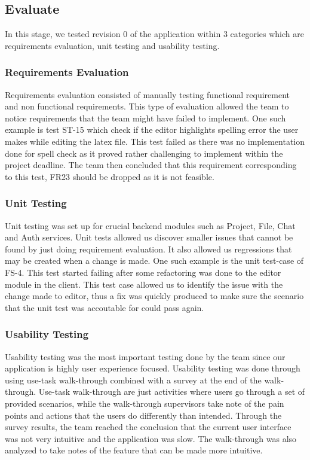 \documentclass{article}
\begin{document}
	\subsection{Evaluate}
	In this stage, we tested revision 0 of the application within 3 categories which are requirements evaluation, unit testing and usability testing.
	
	\subsubsection{Requirements Evaluation}
	Requirements evaluation consisted of manually testing functional requirement and non functional requirements. This type of evaluation allowed the team to notice requirements that the team might have failed to implement. One such example is test ST-15 which check if the editor highlights spelling error the user makes while editing the latex file. This test failed as there was no implementation done for spell check as it proved rather challenging to implement within the project deadline. The team then concluded that this requirement corresponding to this test, FR23 should be dropped as it is not feasible.
	
	\subsubsection{Unit Testing}
	
	Unit testing was set up for crucial backend modules such as Project, File, Chat and Auth services. Unit tests allowed us discover smaller issues that cannot be found by just doing requirement evaluation. It also allowed us regressions that may be created when a change is made. One such example is the unit test-case of FS-4. This test started failing after some refactoring was done to the editor module in the client. This test case allowed us to identify the issue with the change made to editor, thus a fix was quickly produced to make sure the scenario that the unit test was accoutable for could pass again.
	
	\subsubsection{Usability Testing}
	
	Usability testing was the most important testing done by the team since our application is highly user experience focused. Usability testing was done through using use-task walk-through combined with a survey at the end of the walk-through. Use-task walk-through are just activities where users go through a set of provided scenarios, while the walk-through supervisors take note of the pain points and actions that the users do differently than intended. Through the survey results, the team reached the conclusion that the current user interface was not very intuitive and the application was slow. The walk-through was also analyzed to take notes of the feature that can be made more intuitive.
	
\end{document}
